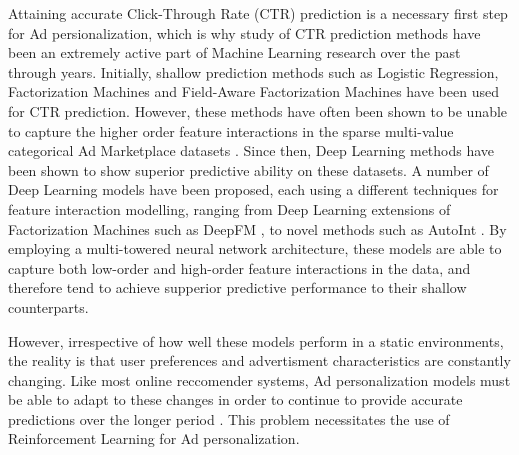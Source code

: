 \documentclass{mldsmsc}
\begin{document}
Attaining accurate Click-Through Rate (CTR) 
prediction is a necessary first step for Ad persionalization, which is why study of CTR prediction methods have been an extremely active part of 
Machine Learning research over the past through years. Initially, shallow prediction methods such as Logistic Regression, Factorization Machines \citep{RefWorks:rendle2010factorization} and Field-Aware Factorization 
Machines \citep{RefWorks:juan2016field-aware} have been used for CTR prediction. However, these methods have often been shown to be unable to capture the 
higher order feature interactions in the sparse multi-value categorical Ad Marketplace datasets \citep{RefWorks:zhang2021deep}. Since then, Deep Learning methods have been 
shown to show superior predictive ability on these datasets. A number of Deep Learning models have been proposed, each using a
different techniques for feature interaction modelling, ranging from Deep Learning extensions of Factorization Machines
such as DeepFM \citep{RefWorks:guo2017deepfm:}, to novel methods such as AutoInt \citep{RefWorks:song2019autoint}. By employing a
multi-towered neural network architecture, these models are able to capture both low-order and high-order feature interactions in the data,
and therefore tend to achieve supperior predictive performance to their shallow counterparts.

However, irrespective of how well these models perform in a static environments, the reality is that user preferences
and advertisment characteristics are constantly changing. Like most online reccomender systems,
Ad personalization models must be able to adapt to these changes in order to continue to provide accurate predictions 
over the longer period \citep{RefWorks:zheng2018drn:}. This problem necessitates the use
of Reinforcement Learning for Ad personalization.
\end{document}

